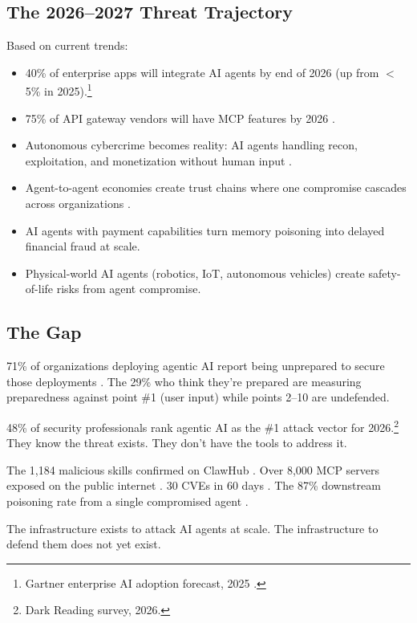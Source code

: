 \documentclass[11pt,letterpaper]{article}
\begin{document}
\subsection{The 2026--2027 Threat Trajectory}

Based on current trends:

\begin{itemize}
\item 40\% of enterprise apps will integrate AI agents by end of 2026 (up from $<$5\% in 2025).\footnote{Gartner enterprise AI adoption forecast, 2025 \cite{gartner}.}
\item 75\% of API gateway vendors will have MCP features by 2026 \cite{gartner}.
\item Autonomous cybercrime becomes reality: AI agents handling recon, exploitation, and monetization without human input \cite{trendmicro}.
\item Agent-to-agent economies create trust chains where one compromise cascades across organizations \cite{galileo}.
\item AI agents with payment capabilities turn memory poisoning into delayed financial fraud at scale.
\item Physical-world AI agents (robotics, IoT, autonomous vehicles) create safety-of-life risks from agent compromise.
\end{itemize}


\subsection{The Gap}

71\% of organizations deploying agentic AI report being unprepared to secure those deployments \cite{cisco}. The 29\% who think they're prepared are measuring preparedness against point \#1 (user input) while points 2--10 are undefended.

48\% of security professionals rank agentic AI as the \#1 attack vector for 2026.\footnote{Dark Reading survey, 2026.} They know the threat exists. They don't have the tools to address it.

The 1,184 malicious skills confirmed on ClawHub \cite{antiy}. Over 8,000 MCP servers exposed on the public internet \cite{checkmarx,paloalto}. 30 CVEs in 60 days \cite{checkmarx,cosai}. The 87\% downstream poisoning rate from a single compromised agent \cite{galileo}.

The infrastructure exists to attack AI agents at scale. The infrastructure to defend them does not yet exist.
\end{document}
